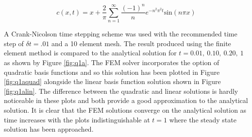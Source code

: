 \documentclass[11pt]{article}
\begin{document}
\begin{equation} \label{eq:q1aAnal}
c(x,t) = x + \frac{2}{\pi} \sum_{n=1}^{\infty} \frac{(-1)^n}{n} e^{-n^2\pi^2t}\text{sin}(n\pi x)
\end{equation}



A Crank-Nicolson time stepping scheme was used with the recommended time step of $\delta t = .01$ and a 10 element mesh. The result produced using the finite element method is compared to the analytical solution for $ t = 0.01, \ 0.10, \ 0.20, \ 1$ as shown by Figure \ref{fig:q1a}. The FEM solver incorporates the option of quadratic basis functions and so this solution has been plotted in Figure \ref{fig:q1aquad} alongside the linear basis function solution shown in Figure \ref{fig:q1alin}. The difference between the quadratic and linear solutions is hardly noticeable in these plots and both provide a good approximation to the analytical solution. It is clear that the FEM solutions converge on the analytical solution as time increases with the plots indistinguishable at $t = 1$ where the steady state solution has been approached.
\end{document}
